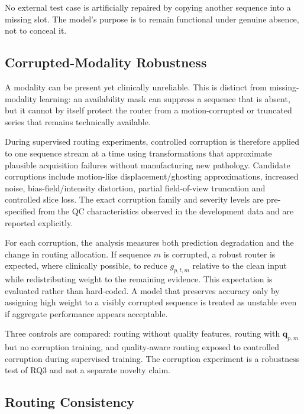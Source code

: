 No external test case is artificially repaired by copying another sequence into
a missing slot. The model's purpose is to remain functional under genuine
absence, not to conceal it.

\subsection{Corrupted-Modality Robustness}
\label{sec:method-routing-corruption}

A modality can be present yet clinically unreliable. This is distinct from
missing-modality learning: an availability mask can suppress a sequence that is
absent, but it cannot by itself protect the router from a motion-corrupted or
truncated series that remains technically available.

During supervised routing experiments, controlled corruption is therefore
applied to one sequence stream at a time using transformations that approximate
plausible acquisition failures without manufacturing new pathology. Candidate
corruptions include motion-like displacement/ghosting approximations, increased
noise, bias-field/intensity distortion, partial field-of-view truncation and
controlled slice loss. The exact corruption family and severity levels are
pre-specified from the QC characteristics observed in the development data and
are reported explicitly.

For each corruption, the analysis measures both prediction degradation and the
change in routing allocation. If sequence $m$ is corrupted, a robust router is
expected, where clinically possible, to reduce $g_{p,t,m}$ relative to the clean
input while redistributing weight to the remaining evidence. This expectation
is evaluated rather than hard-coded. A model that preserves accuracy only by
assigning high weight to a visibly corrupted sequence is treated as unstable
even if aggregate performance appears acceptable.

Three controls are compared: routing without quality features, routing with
$\mathbf{q}_{p,m}$ but no corruption training, and quality-aware routing exposed
to controlled corruption during supervised training. The corruption experiment
is a robustness test of RQ3 and not a separate novelty claim.

\subsection{Routing Consistency}
\label{sec:method-routing-consistency}

